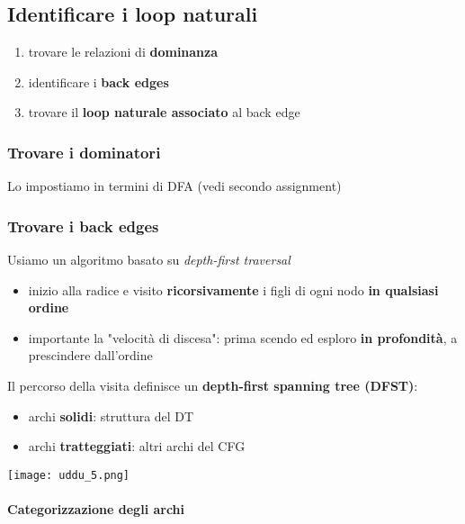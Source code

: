 \subsection{Identificare i loop naturali}

\begin{enumerate}
  \item trovare le relazioni di \textbf{dominanza}
  \item identificare i \textbf{back edges}
  \item trovare il \textbf{loop naturale associato} al back edge
\end{enumerate}

\subsubsection{Trovare i dominatori}

Lo impostiamo in termini di DFA (vedi secondo assignment)

\subsubsection{Trovare i back edges}

\noindent \begin{minipage}[c]{.67\textwidth}
  Usiamo un algoritmo basato su \textit{depth-first traversal
  }
  \begin{itemize}
    \item inizio alla radice e visito \textbf{ricorsivamente} i figli di ogni nodo \textbf{in qualsiasi ordine}
    \item importante la "velocit\`a di discesa": prima scendo ed esploro \textbf{in profondit\`a}, a prescindere dall'ordine
  \end{itemize}

  Il percorso della visita definisce un \textbf{depth-first spanning tree (DFST)}:
  \begin{itemize}
    \item archi \textbf{solidi}: struttura del DT
    \item archi \textbf{tratteggiati}: altri archi del CFG
  \end{itemize}
\end{minipage}\hfill
\begin{minipage}[c]{.3\textwidth}
  \texttt{[image: uddu\_5.png]}
\end{minipage}

\paragraph{Categorizzazione degli archi}

